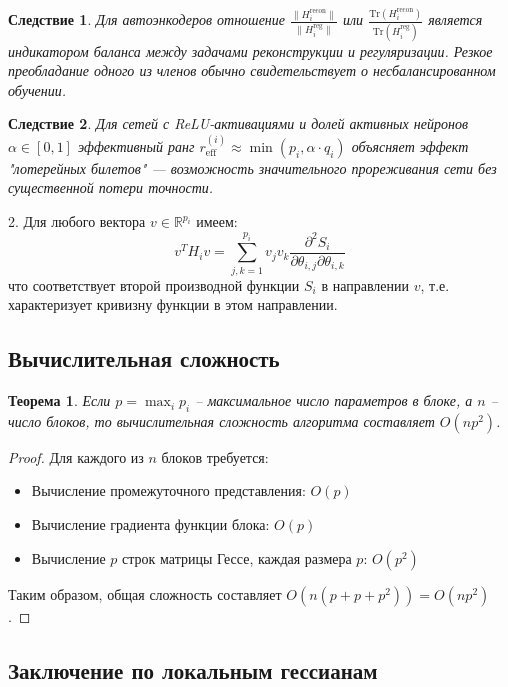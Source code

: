 \documentclass[a4paper,12pt]{article}
\newtheorem{theorem}{Теорема}
\newtheorem{corollary}{Следствие}
\begin{document}
    \begin{corollary}
    Для автоэнкодеров отношение $\frac{\|H_i^{\text{recon}}\|}{\|H_i^{\text{reg}}\|}$ или $\frac{\text{Tr}(H_i^{\text{recon}})}{\text{Tr}(H_i^{\text{reg}})}$ является индикатором баланса между задачами реконструкции и регуляризации. Резкое преобладание одного из членов обычно свидетельствует о несбалансированном обучении.
    \end{corollary}
    
    \begin{corollary}
    Для сетей с ReLU-активациями и долей активных нейронов $\alpha \in [0,1]$ эффективный ранг $r_{\text{eff}}^{(i)} \approx \min(p_i, \alpha \cdot q_i)$ объясняет эффект "лотерейных билетов" — возможность значительного прореживания сети без существенной потери точности.
    \end{corollary}

2. Для любого вектора $v \in \mathbb{R}^{p_i}$ имеем:
\begin{equation}
    v^T H_i v = \sum_{j,k=1}^{p_i} v_j v_k \frac{\partial^2 S_i}{\partial \theta_{i,j} \partial \theta_{i,k}}
\end{equation}
что соответствует второй производной функции $S_i$ в направлении $v$, т.е. характеризует кривизну функции в этом направлении.

\subsection{Вычислительная сложность}

\begin{theorem}
Если $p = \max_{i} p_i$ -- максимальное число параметров в блоке, а $n$ -- число блоков, то вычислительная сложность алгоритма составляет $O(np^2)$.
\end{theorem}

\begin{proof}
Для каждого из $n$ блоков требуется:
\begin{itemize}
\item Вычисление промежуточного представления: $O(p)$
\item Вычисление градиента функции блока: $O(p)$
\item Вычисление $p$ строк матрицы Гессе, каждая размера $p$: $O(p^2)$
\end{itemize}
Таким образом, общая сложность составляет $O(n(p + p + p^2)) = O(np^2)$.
\end{proof}

\subsection{Заключение по локальным гессианам}
\end{document}
